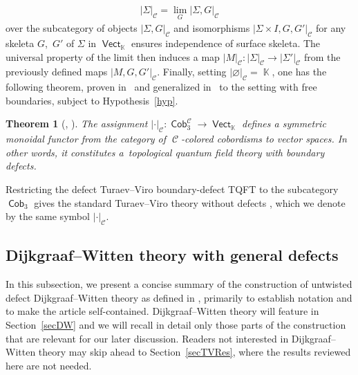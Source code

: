 \documentclass[10pt,a4paper]{amsart}
\DeclareMathOperator{\vect}{\mathsf{Vect}}
\DeclareMathOperator{\K}{\mathbb{K}}
\DeclareMathOperator{\Cob}{\mathsf{Cob}}
\DeclareMathOperator{\calc}{\mathcal{C}}
\numberwithin{equation}{section}
\newtheorem{Theorem}{Theorem}[section]
\theoremstyle{definition}
\begin{document}
\begin{enumerate}
 \begin{align*}
 |\Sigma|_{\calc} = \lim_G |\Sigma, G|_{\calc}
 \end{align*}
 over the subcategory of objects $|\Sigma, G|_{\calc}$ and isomorphisms $|\Sigma \times I, G, G'|_{\calc}$ for any skeleta $G$,~$G'$ of $\Sigma$ in $\vect_{\K}$ ensures independence of surface skeleta. The universal property of the limit then induces a map $|M|_{\calc}\colon |\Sigma|_{\calc} \rightarrow |\Sigma'|_{\calc}$ from the previously defined maps $|M, G, G'|_{\calc}$. Finally, setting $|\varnothing|_{\calc} = \K$, one has the following theorem, proven in~\cite{TV} and generalized in~\cite{F} to the setting with free boundaries, subject to Hypothesis~\ref{hyp}.
\end{enumerate}
\begin{Theorem}[{\cite[Theorem 15.9]{TV}, \cite[Section 4.2)]{F}}]
 The assignment $| \cdot |_{\calc}\colon \Cob_3^{\calc} \rightarrow \vect_{\K}$ defines a symmetric monoidal functor from the category of $\calc$-colored cobordisms to vector spaces. In other words, it constitutes a~topological quantum field theory with boundary defects.
\end{Theorem}
Restricting the defect Turaev--Viro boundary-defect TQFT to the subcategory $\Cob_3$ gives the standard Turaev--Viro theory without defects \cite[Section~13]{TV}, which we denote by the same symbol $|\cdot|_{\calc}$.

\subsection{Dijkgraaf--Witten theory with general defects}
\label{subSecDW}
In this subsection, we present a concise summary of the construction of untwisted defect Dijk\-graaf--Witten theory as defined in \cite{FMM}, primarily to establish notation and to make the article self-contained. Dijkgraaf--Witten theory will feature in Section~\ref{secDW} and we will recall in detail only those parts of the construction that are relevant for our later discussion. Readers not interested in Dijkgraaf--Witten theory may skip ahead to Section~\ref{secTVRes}, where the results reviewed here are not needed.
\end{document}

